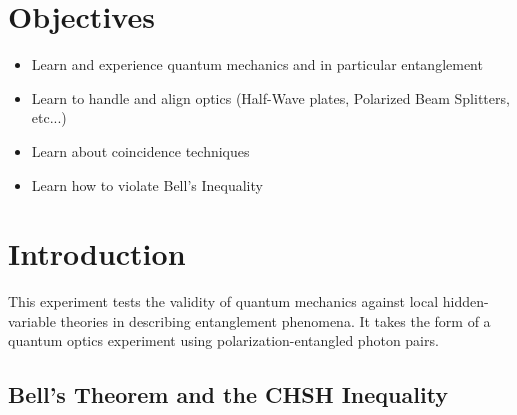 \documentclass{../lab}
\begin{document}
\section{Objectives}

\begin{itemize}
    \item Learn and experience quantum mechanics and in particular entanglement

    \item Learn to handle and align optics (Half-Wave plates, Polarized Beam Splitters, etc...)

    \item Learn about coincidence techniques

    \item Learn how to violate Bell's Inequality

\end{itemize}

\section{Introduction}
\label{sec:Introduction}

This experiment tests the validity of quantum mechanics against local hidden-variable theories in describing entanglement phenomena. It takes the form of a quantum optics experiment using polarization-entangled photon pairs.

\subsection{Bell's Theorem and the CHSH Inequality}
\end{document}
